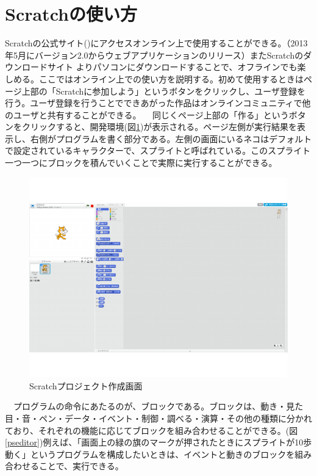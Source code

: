 \documentclass[a4paper,10pt,onecolumn,oneside,openany]{jsbook}
\begin{document}
\section{Scratchの使い方}
Scratchの公式サイト(\cite{scratch})にアクセスオンライン上で使用することができる。（2013年5月にバージョン2.0からウェブアプリケーションのリリース）またScratchのダウンロードサイト\cite{scratch_official}
よりパソコンにダウンロードすることで、オフラインでも楽しめる。ここではオンライン上での使い方を説明する。初めて使用するときはページ上部の「Scratchに参加しよう」というボタンをクリックし、ユーザ登録を行う。ユーザ登録を行うことでできあがった作品はオンラインコミュニティで他のユーザと共有することができる。
　同じくページ上部の「作る」というボタンをクリックすると、開発環境(図\ref{editor})が表示される。ページ左側が実行結果を表示し、右側がプログラムを書く部分である。左側の画面にいるネコはデフォルトで設定されているキャラクターで、スプライトと呼ばれている。このスプライト一つ一つにブロックを積んでいくことで実際に実行することができる。
\begin{figure}[!h]
  \centering
    \includegraphics[scale=0.5]{scratch_editor_main.pdf}
  \caption{Scratchプロジェクト作成画面}
  \label{editor}
 \end{figure}
　プログラムの命令にあたるのが、ブロックである。ブロックは、動き・見た目・音・ペン・データ・イベント・制御・調べる・演算・その他の種類に分かれており、それぞれの機能に応じてブロックを組み合わせることができる。(図\ref{pseditor})例えば、「画面上の緑の旗のマークが押されたときにスプライトが10歩動く」というプログラムを構成したいときは、イベントと動きのブロックを組み合わせることで、実行できる。
\end{document}
